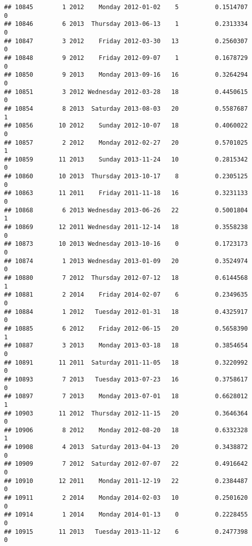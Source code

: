 \documentclass[
]{article}
\begin{document}
\begin{verbatim}
## 10845        1 2012    Monday 2012-01-02    5          0.1514707             0
## 10846        6 2013  Thursday 2013-06-13    1          0.2313334             0
## 10847        3 2012    Friday 2012-03-30   13          0.2560307             0
## 10848        9 2012    Friday 2012-09-07    1          0.1678729             0
## 10850        9 2013    Monday 2013-09-16   16          0.3264294             0
## 10851        3 2012 Wednesday 2012-03-28   18          0.4450615             0
## 10854        8 2013  Saturday 2013-08-03   20          0.5587687             1
## 10856       10 2012    Sunday 2012-10-07   18          0.4060022             0
## 10857        2 2012    Monday 2012-02-27   20          0.5701025             1
## 10859       11 2013    Sunday 2013-11-24   10          0.2815342             0
## 10860       10 2013  Thursday 2013-10-17    8          0.2305125             0
## 10863       11 2011    Friday 2011-11-18   16          0.3231133             0
## 10868        6 2013 Wednesday 2013-06-26   22          0.5001804             1
## 10869       12 2011 Wednesday 2011-12-14   18          0.3558238             0
## 10873       10 2013 Wednesday 2013-10-16    0          0.1723173             0
## 10874        1 2013 Wednesday 2013-01-09   20          0.3524974             0
## 10880        7 2012  Thursday 2012-07-12   18          0.6144568             1
## 10881        2 2014    Friday 2014-02-07    6          0.2349635             0
## 10884        1 2012   Tuesday 2012-01-31   18          0.4325917             0
## 10885        6 2012    Friday 2012-06-15   20          0.5658390             1
## 10887        3 2013    Monday 2013-03-18   18          0.3854654             0
## 10891       11 2011  Saturday 2011-11-05   18          0.3220992             0
## 10893        7 2013   Tuesday 2013-07-23   16          0.3758617             0
## 10897        7 2013    Monday 2013-07-01   18          0.6628012             1
## 10903       11 2012  Thursday 2012-11-15   20          0.3646364             0
## 10906        8 2012    Monday 2012-08-20   18          0.6332328             1
## 10908        4 2013  Saturday 2013-04-13   20          0.3438872             0
## 10909        7 2012  Saturday 2012-07-07   22          0.4916642             0
## 10910       12 2011    Monday 2011-12-19   22          0.2384487             0
## 10911        2 2014    Monday 2014-02-03   10          0.2501620             0
## 10914        1 2014    Monday 2014-01-13    0          0.2228455             0
## 10915       11 2013   Tuesday 2013-11-12    6          0.2477398             0

\end{verbatim}
\end{document}
